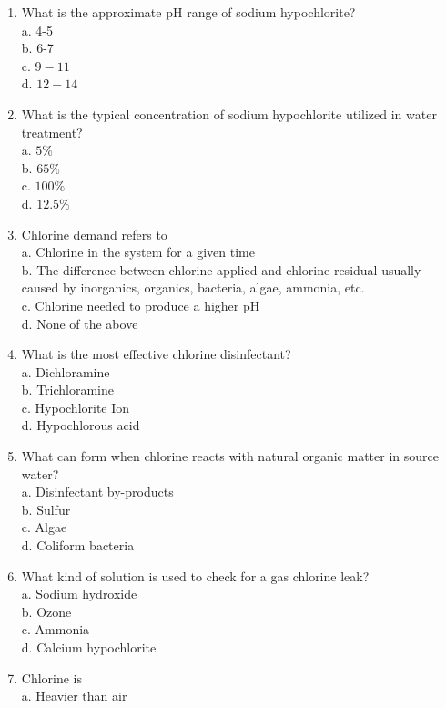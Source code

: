 \begin{enumerate}[1.]
\item What is the approximate $\mathrm{pH}$ range of sodium hypochlorite?\\
a. 4-5\\
b. 6-7\\
c. $9-11$\\
d. $12-14$\\
\item What is the typical concentration of sodium hypochlorite utilized in water treatment?\\
a. $5 \%$\\
b. $65 \%$\\
c. $100 \%$\\
d. $12.5 \%$\\
\item Chlorine demand refers to\\
a. Chlorine in the system for a given time\\
b. The difference between chlorine applied and chlorine residual-usually caused by inorganics, organics, bacteria, algae, ammonia, etc.\\
c. Chlorine needed to produce a higher $\mathrm{pH}$\\
d. None of the above\\
\item What is the most effective chlorine disinfectant?\\
a. Dichloramine\\
b. Trichloramine\\
c. Hypochlorite Ion\\
d. Hypochlorous acid\\
\item What can form when chlorine reacts with natural organic matter in source water?\\
a. Disinfectant by-products\\
b. Sulfur\\
c. Algae\\
d. Coliform bacteria\\
\item What kind of solution is used to check for a gas chlorine leak?\\
a. Sodium hydroxide\\
b. Ozone\\
c. Ammonia\\
d. Calcium hypochlorite\\
\item Chlorine is\\
a. Heavier than air\\

\end{enumerate}
